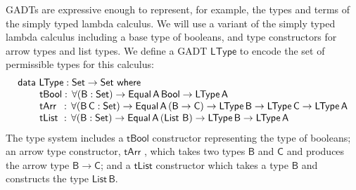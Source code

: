 \documentclass[9pt]{entcs} \usepackage{entcsmacro}
\begin{document}
\begin{example}\label{example:lterm}
GADTs are expressive enough to represent, for example, the types and terms of the simply typed lambda calculus. 
We will use a variant of the simply typed lambda calculus including a base type of booleans,
and type constructors for arrow types and list types. 
We define a GADT $\mathsf{LType}$ to encode the set of permissible types for this calculus:
\begin{equation}\label{eq:eq_ltype}
\begin{array}{l}
\mathsf{data\ LType : Set \to Set\ where}\\
\mathsf{\;\;\;\;\;\;\;\;tBool :\, \forall (B : Set) \to Equal\,A\,Bool \to LType\,A}\\
\mathsf{\;\;\;\;\;\;\;\;tArr\,\,\, :\, \forall (B\,C : Set) \to Equal\,A\,(B \to C) \to LType\,B \to LType\,C \to LType\,A}\\
  \mathsf{\;\;\;\;\;\;\;\;tList\,\, :\, \forall (B : Set) \to Equal\,A\,(\mathsf{List}\,\,B) \to LType\,B \to LType\,A}
\end{array}
\end{equation}
The type system includes a $\mathsf{tBool}$ constructor representing the type of booleans;
an arrow type constructor, $\mathsf{tArr}$ , which takes two types $\mathsf{B}$ and $\mathsf{C}$
and produces the arrow type $\mathsf{B \to C}$;
and a $\mathsf{tList}$ constructor which takes a type $\mathsf{B}$ and constructs
the type $\mathsf{List\,B}$.



\end{example}
\end{document}
